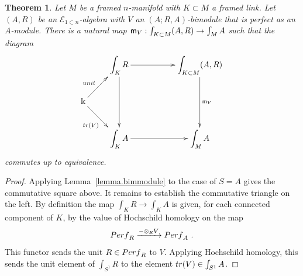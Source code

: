 \documentclass[10pt,a4paper]{amsart}
\newtheorem{thm}{Theorem}
\def\Perf{{\rm Perf}}
\def\cE{\mathcal E}\def\cF{\mathcal F}\def\cG{\mathcal G}\def\cH{\mathcal H}
\def\ot{\otimes}
\newcommand{\ra}{\rightarrow}
\def\tr{{\rm tr}}
\newcommand{\xra}{\xrightarrow}
\begin{document}
\begin{thm}  
Let $M$ be a framed $n$-manifold with $K\subset M$ a framed link. 
Let $(A,R)$ be an $\cE_{1\subset n}$-algebra with $V$ an $(A;R, A)$-bimodule that is perfect as an $A$-module. 
There is a natural map ${\sf m}_V:\int_{K\subset M}(A,R)\to \int_MA$ such that the diagram 
\[
\xymatrix{
&\displaystyle\int_K R\ar[rr]\ar[dd]&&\displaystyle\int_{K\subset M}(A,R)\ar[dd]^-{{\sf m}_V}\\
\Bbbk\ar[rd]_{\tr(V)}\ar[ru]^-{\rm unit}\\
&\displaystyle\int_{K}A\ar[rr]&& \displaystyle\int_{M}A\\}
\]
commutes up to equivalence.
\end{thm}

\begin{proof} 
Applying Lemma~\ref{lemma.bimmodule} to the case of $S=A$ gives the commutative square above. It remains to establish the commutative triangle on the left. By definition the map $\int_K R \ra \int_K A$ is given, for each connected component of $K$, by the value of Hochschild homology on the map
\[
\Perf_R \xra{-\ot_R V} \Perf_A~.
\]
This functor sends the unit $R\in\Perf_R$ to $V$. Applying Hochschild homology, this sends the unit element of $\int_{S^1} R$ to the element $\tr(V)\in \int_{S^1}A$.
\end{proof}
\end{document}
